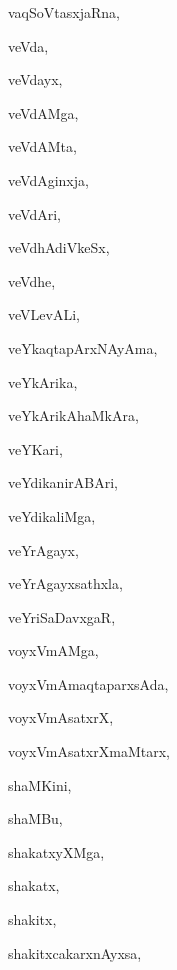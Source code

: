 \begin{multicols}{3}
{\noindent
{vaqSoVtasxjaRna}, \pageref{vaqSoVtasxjaRna}

\noindent
{veVda}, \pageref{veVda}

\noindent
{veVdayx}, \pageref{veVdayx}

\noindent
{veVdAMga}, \pageref{veVdAMga}

\noindent
{veVdAMta}, \pageref{veVdAMta}

\noindent
{veVdAginxja}, \pageref{veVdAginxja}

\noindent
{veVdAri}, \pageref{veVdAri}

\noindent
{veVdhAdiVkeSx}, \pageref{veVdhAdiVkeSx}

\noindent
{veVdhe}, \pageref{veVdhe}

\noindent
{veVLevALi}, \pageref{veVLevALi}

\noindent
{veYkaqtapArxNAyAma}, \pageref{veYkaqtapArxNAyAma}

\noindent
{veYkArika}, \pageref{veYkArika}

\noindent
{veYkArikAhaMkAra}, \pageref{veYkArikAhaMkAra}

\noindent
{veYKari}, \pageref{veYKari}

\noindent
{veYdikanirABAri}, \pageref{veYdikanirABAri}

\noindent
{veYdikaliMga}, \pageref{veYdikaliMga}

\noindent
{veYrAgayx}, \pageref{veYrAgayx}

\noindent
{veYrAgayxsathxla}, \pageref{veYrAgayxsathxla}

\noindent
{veYriSaDavxgaR}, \pageref{veYriSaDavxgaR}

\noindent
{voyxVmAMga}, \pageref{voyxVmAMga}

\noindent
{voyxVmAmaqtaparxsAda}, \pageref{voyxVmAmaqtaparxsAda}

\noindent
{voyxVmAsatxrX}, \pageref{voyxVmAsatxrX}

\noindent
{voyxVmAsatxrXmaMtarx}, \pageref{voyxVmAsatxrXmaMtarx}

\bigskip
\noindent
{}
\smallskip

\noindent
{shaMKini}, \pageref{shaMKini}

\noindent
{shaMBu}, \pageref{shaMBu}

\noindent
{shakatxyXMga}, \pageref{shakatxyXMga}

\noindent
{shakatx}, \pageref{shakatx}

\noindent
{shakitx}, \pageref{shakitx}

\noindent
{shakitxcakarxnAyxsa}, \pageref{shakitxcakarxnAyxsa}

}
\end{multicols}

